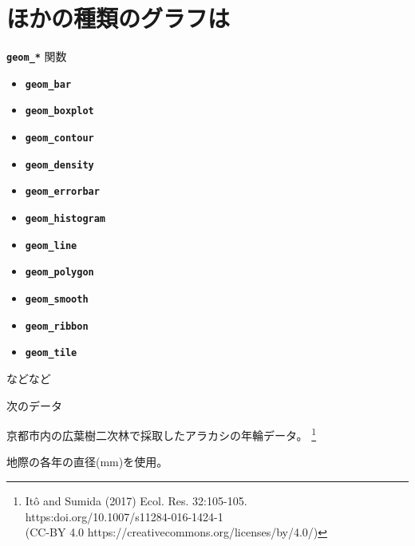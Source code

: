 \documentclass[ignorenonframetext,]{beamer}
\newenvironment{Shaded}{\begin{snugshade}}{\end{snugshade}}
\newcommand{\KeywordTok}[1]{\textcolor[rgb]{0.13,0.29,0.53}{\textbf{#1}}}
\newcommand{\DataTypeTok}[1]{\textcolor[rgb]{0.13,0.29,0.53}{#1}}
\newcommand{\DecValTok}[1]{\textcolor[rgb]{0.00,0.00,0.81}{#1}}
\newcommand{\StringTok}[1]{\textcolor[rgb]{0.31,0.60,0.02}{#1}}
\newcommand{\OperatorTok}[1]{\textcolor[rgb]{0.81,0.36,0.00}{\textbf{#1}}}
\newcommand{\NormalTok}[1]{#1}
\providecommand{\tightlist}{%
  \setlength{\itemsep}{0pt}\setlength{\parskip}{0pt}}
\let\oldShaded\Shaded
\let\endoldShaded\endShaded
\renewenvironment{Shaded}{\footnotesize\oldShaded}{\endoldShaded}
\begin{document}
\section{ほかの種類のグラフは}

\begin{frame}[fragile]{\textbf{\texttt{geom\_*}} 関数}

\begin{itemize}
\tightlist
\item
  \textbf{\texttt{geom\_bar}}
\item
  \textbf{\texttt{geom\_boxplot}}
\item
  \textbf{\texttt{geom\_contour}}
\item
  \textbf{\texttt{geom\_density}}
\item
  \textbf{\texttt{geom\_errorbar}}
\item
  \textbf{\texttt{geom\_histogram}}
\item
  \textbf{\texttt{geom\_line}}
\item
  \textbf{\texttt{geom\_polygon}}
\item
  \textbf{\texttt{geom\_smooth}}
\item
  \textbf{\texttt{geom\_ribbon}}
\item
  \textbf{\texttt{geom\_tile}}
\end{itemize}

などなど

\end{frame}

\begin{frame}[fragile]{次のデータ}

京都市内の広葉樹二次林で採取したアラカシの年輪データ。
\footnote{Itô and Sumida (2017) Ecol. Res. 32:105-105. \\
\hspace{14pt} https:doi.org/10.1007/s11284-016-1424-1 \\
\hspace{14pt} (CC-BY 4.0 https://creativecommons.org/licenses/by/4.0/)}

地際の各年の直径(mm)を使用。

\begin{Shaded}
\end{Shaded}

\end{frame}
\end{document}

